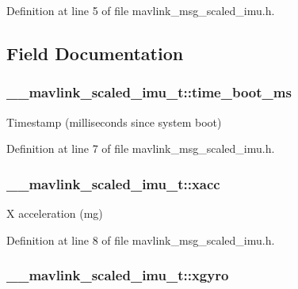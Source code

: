 Definition at line 5 of file mavlink\-\_\-msg\-\_\-scaled\-\_\-imu.\-h.



\subsection{Field Documentation}
\hypertarget{struct____mavlink__scaled__imu__t_a3bdcf7dc969ea7ca67657b1420652468}{
\subsubsection[{time\-\_\-boot\-\_\-ms}]{ \-\_\-\-\_\-mavlink\-\_\-scaled\-\_\-imu\-\_\-t\-::time\-\_\-boot\-\_\-ms}}\label{struct____mavlink__scaled__imu__t_a3bdcf7dc969ea7ca67657b1420652468}


Timestamp (milliseconds since system boot) 



Definition at line 7 of file mavlink\-\_\-msg\-\_\-scaled\-\_\-imu.\-h.

\hypertarget{struct____mavlink__scaled__imu__t_a2fe0911cd27268449b437b15d5bc8ab7}{
\subsubsection[{xacc}]{ \-\_\-\-\_\-mavlink\-\_\-scaled\-\_\-imu\-\_\-t\-::xacc}}\label{struct____mavlink__scaled__imu__t_a2fe0911cd27268449b437b15d5bc8ab7}


X acceleration (mg) 



Definition at line 8 of file mavlink\-\_\-msg\-\_\-scaled\-\_\-imu.\-h.

\hypertarget{struct____mavlink__scaled__imu__t_aed9c79287653e608e2eef8b904189fae}{
\subsubsection[{xgyro}]{ \-\_\-\-\_\-mavlink\-\_\-scaled\-\_\-imu\-\_\-t\-::xgyro}}\label{struct____mavlink__scaled__imu__t_aed9c79287653e608e2eef8b904189fae}


